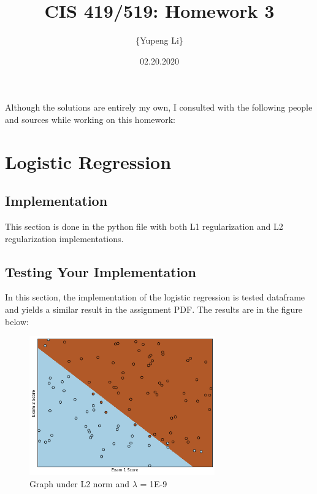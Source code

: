\documentclass{article}
\title{CIS 419/519: Homework 3}
\author{\{Yupeng Li\}}
\date{02.20.2020}
\begin{document}
    \maketitle
    Although the solutions are entirely my own, I consulted with the following people and sources while working on this homework:
    
    \section{Logistic Regression}
    	\subsection{Implementation}
	This section is done in the python file with both L1 regularization and L2 regularization implementations.
	
	\subsection{Testing Your Implementation}
	In this section, the implementation of the logistic regression is tested dataframe and yields a similar result in the assignment PDF. The results are in the figure below:
		\begin{figure}[H]
			\caption{Graph under L2 norm and $\lambda$ = 1E-9}
			\centering
			\includegraphics[width=8cm]{LinearL2norm.png}
		\end{figure}
\end{document}
